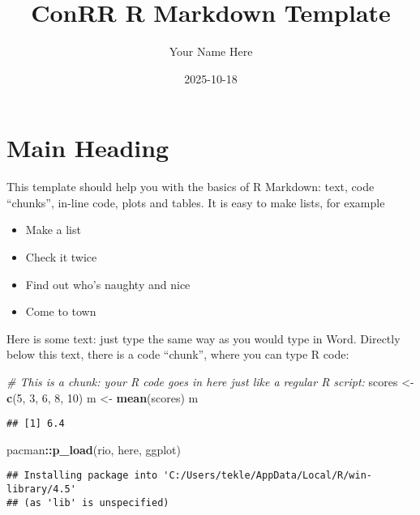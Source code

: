 \documentclass[
]{article}
\title{ConRR R Markdown Template}
\author{Your Name Here}
\date{2025-10-18}
\newenvironment{Shaded}{\begin{snugshade}}{\end{snugshade}}
\newcommand{\CommentTok}[1]{\textcolor[rgb]{0.56,0.35,0.01}{\textit{#1}}}
\newcommand{\DecValTok}[1]{\textcolor[rgb]{0.00,0.00,0.81}{#1}}
\newcommand{\FunctionTok}[1]{\textcolor[rgb]{0.13,0.29,0.53}{\textbf{#1}}}
\newcommand{\NormalTok}[1]{#1}
\newcommand{\OtherTok}[1]{\textcolor[rgb]{0.56,0.35,0.01}{#1}}
\newcommand{\SpecialCharTok}[1]{\textcolor[rgb]{0.81,0.36,0.00}{\textbf{#1}}}
\providecommand{\tightlist}{%
  \setlength{\itemsep}{0pt}\setlength{\parskip}{0pt}}
\begin{document}
\maketitle

{
\setcounter{tocdepth}{2}
\tableofcontents
}
\section{Main Heading}\label{main-heading}

This template should help you with the basics of R Markdown: text, code
``chunks'', in-line code, plots and tables. It is easy to make lists,
for example

\begin{itemize}
\tightlist
\item
  Make a list
\item
  Check it twice
\item
  Find out who's naughty and nice
\item
  Come to town
\end{itemize}

Here is some text: just type the same way as you would type in Word.
Directly below this text, there is a code ``chunk'', where you can type
R code:

\begin{Shaded}
\begin{Highlighting}[]
\CommentTok{\# This is a chunk: your R code goes in here just like a regular R script:}
\NormalTok{scores }\OtherTok{\textless{}{-}} \FunctionTok{c}\NormalTok{(}\DecValTok{5}\NormalTok{, }\DecValTok{3}\NormalTok{, }\DecValTok{6}\NormalTok{, }\DecValTok{8}\NormalTok{, }\DecValTok{10}\NormalTok{)}
\NormalTok{m }\OtherTok{\textless{}{-}} \FunctionTok{mean}\NormalTok{(scores)}
\NormalTok{m}
\end{Highlighting}
\end{Shaded}

\begin{verbatim}
## [1] 6.4
\end{verbatim}

\begin{Shaded}
\begin{Highlighting}[]
\NormalTok{pacman}\SpecialCharTok{::}\FunctionTok{p\_load}\NormalTok{(rio, here, ggplot)}
\end{Highlighting}
\end{Shaded}

\begin{verbatim}
## Installing package into 'C:/Users/tekle/AppData/Local/R/win-library/4.5'
## (as 'lib' is unspecified)
\end{verbatim}
\end{document}
